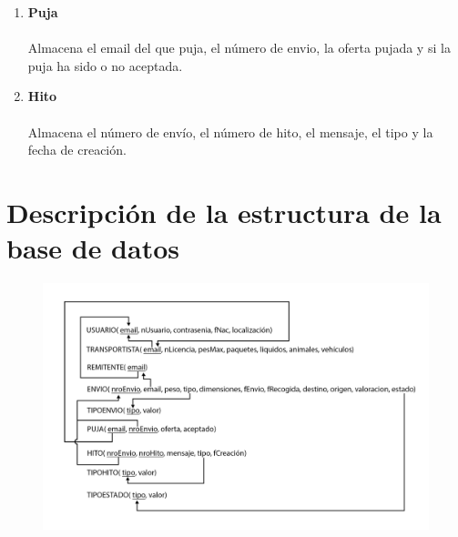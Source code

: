 \documentclass[10pt, a4paper,spanish]{article}
\begin{document}
\begin{enumerate}
			    \item \textbf {Puja}
			        \paragraph{}
			        Almacena el email del que puja, el número de envio, la oferta pujada y si la puja ha sido o no aceptada.


				\item \textbf {Hito}
					\paragraph{}
					Almacena el número de envío, el número de hito, el mensaje, el tipo y la fecha de creación.

		\end{enumerate}

    \section{Descripción de la estructura de la base de datos}


		\begin{figure}[H]
			\centering
				\includegraphics[width=1\textwidth]{database.png}
		\end{figure}
\end{document}
